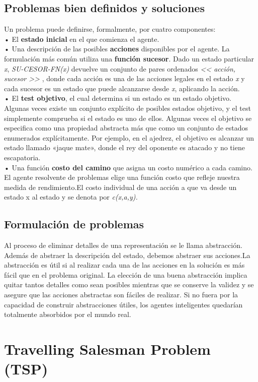 \documentclass[12pt,a4paper]{report}
\begin{document}
\subsection*{Problemas bien definidos y soluciones}
Un problema puede definirse, formalmente, por cuatro componentes:\\• El \textbf{estado inicial} en el que comienza el agente.\\• Una descripción de las posibles \textbf{acciones} disponibles por el agente. La formulación más común utiliza una \textbf{función sucesor}. Dado un estado particular \emph{x}, \emph{SU-CESOR-FN(x)} devuelve un conjunto de pares ordenados \emph{<< acción, sucesor >>} , donde cada acción es una de las acciones legales en el estado \emph{x} y cada sucesor es un estado que puede alcanzarse desde \emph{x}, aplicando la acción.\\• El \textbf{test objetivo}, el cual determina si un estado es un estado objetivo. Algunas veces existe un conjunto explícito de posibles estados objetivo, y el test simplemente comprueba si el estado es uno de ellos. Algunas veces el objetivo se especifica como una propiedad abstracta más que como un conjunto de estados enumerados explícitamente. Por ejemplo, en el ajedrez, el objetivo es alcanzar un estado llamado «jaque mate», donde el rey del oponente es atacado y no tiene escapatoria.\\• Una función \textbf{ costo del camino} que asigna un costo numérico a cada camino. El agente resolvente de problemas elige una función costo que refleje nuestra medida de rendimiento.El costo individual de una acción a que va desde un estado x al estado y se denota por \emph{ c(x,a,y).}
\subsection*{Formulación de problemas}
Al proceso de eliminar detalles de
una representación se le llama abstracción. Además de abstraer la descripción del estado, debemos abstraer sus acciones.La abstracción es útil si al realizar cada una de las acciones en la solución es más fácil que en el problema original. La elección de una buena abstracción implica quitar tantos detalles como sean posibles mientras que se conserve la validez y se asegure que las acciones abstractas son fáciles de realizar. Si no fuera por la capacidad de construir abstracciones útiles, los agentes inteligentes quedarían totalmente absorbidos por el mundo real.
\section{Travelling Salesman Problem (TSP)}
\end{document}
